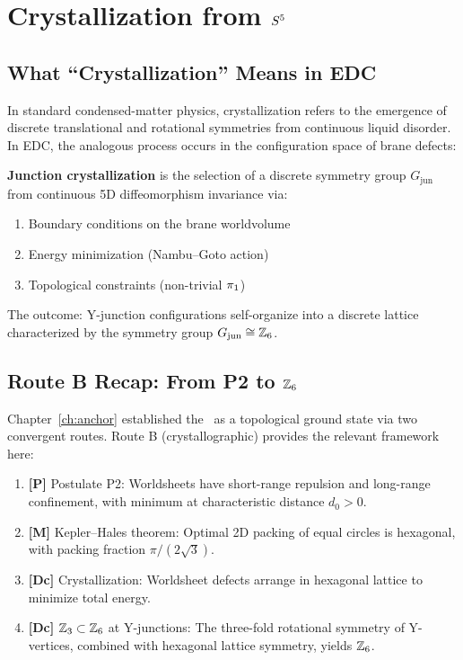 \section{Crystallization from $S^5$}
\label{sec:junction:crystallization}

\subsection{What ``Crystallization'' Means in EDC}

In standard condensed-matter physics, crystallization refers to the emergence
of discrete translational and rotational symmetries from continuous liquid
disorder. In EDC, the analogous process occurs in the configuration space of
brane defects:

\begin{derivationbox}[title=Definition: Junction Crystallization]
    \textbf{Junction crystallization} is the selection of a discrete symmetry
    group $G_{\text{jun}}$ from continuous 5D diffeomorphism invariance via:
    \begin{enumerate}
        \item Boundary conditions on the brane worldvolume
        \item Energy minimization (Nambu--Goto action)
        \item Topological constraints (non-trivial $\pi_1$)
    \end{enumerate}
    \tagDef
\end{derivationbox}

The outcome: Y-junction configurations self-organize into a discrete lattice
characterized by the symmetry group $G_{\text{jun}} \cong \mathbb{Z}_6$.

\subsection{Route B Recap: From P2 to $\mathbb{Z}_6$}

Chapter~\ref{ch:anchor} established the \AnchorJunction\ as a topological
ground state via two convergent routes. Route B (crystallographic) provides
the relevant framework here:

\begin{enumerate}
    \item \textbf{[P]} Postulate P2: Worldsheets have short-range repulsion
          and long-range confinement, with minimum at characteristic
          distance $d_0 > 0$.
    \item \textbf{[M]} Kepler--Hales theorem: Optimal 2D packing of equal
          circles is hexagonal, with packing fraction $\pi/(2\sqrt{3})$.
    \item \textbf{[Dc]} Crystallization: Worldsheet defects arrange in
          hexagonal lattice to minimize total energy.
    \item \textbf{[Dc]} $\mathbb{Z}_3 \subset \mathbb{Z}_6$ at Y-junctions: The
          three-fold rotational symmetry of Y-vertices, combined with
          hexagonal lattice symmetry, yields $\mathbb{Z}_6$.
\end{enumerate}

